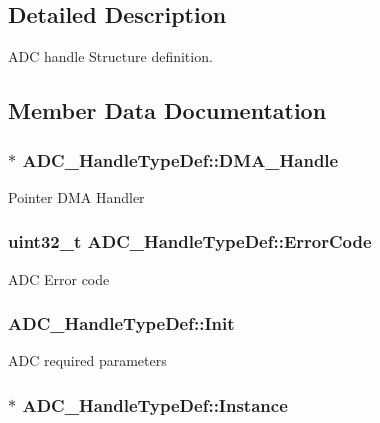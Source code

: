 \subsection{Detailed Description}
A\-D\-C handle Structure definition. 

\subsection{Member Data Documentation}
\hypertarget{struct_a_d_c___handle_type_def_a1983db16acacd5f0b2881e43010dcd72}{
\subsubsection[{D\-M\-A\-\_\-\-Handle}]{$\ast$ A\-D\-C\-\_\-\-Handle\-Type\-Def\-::\-D\-M\-A\-\_\-\-Handle}}\label{struct_a_d_c___handle_type_def_a1983db16acacd5f0b2881e43010dcd72}
Pointer D\-M\-A Handler \hypertarget{struct_a_d_c___handle_type_def_a576634bdfdae8c61203a232876d2ba72}{
\subsubsection[{Error\-Code}]{ uint32\-\_\-t A\-D\-C\-\_\-\-Handle\-Type\-Def\-::\-Error\-Code}}\label{struct_a_d_c___handle_type_def_a576634bdfdae8c61203a232876d2ba72}
A\-D\-C Error code \hypertarget{struct_a_d_c___handle_type_def_a43986a9a8ff67bdb398c01db82fda605}{
\subsubsection[{Init}]{ A\-D\-C\-\_\-\-Handle\-Type\-Def\-::\-Init}}\label{struct_a_d_c___handle_type_def_a43986a9a8ff67bdb398c01db82fda605}
A\-D\-C required parameters \hypertarget{struct_a_d_c___handle_type_def_a3d89e51782aec71f9cfdff63f943d785}{
\subsubsection[{Instance}]{$\ast$ A\-D\-C\-\_\-\-Handle\-Type\-Def\-::\-Instance}}\label{struct_a_d_c___handle_type_def_a3d89e51782aec71f9cfdff63f943d785}
